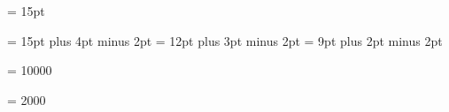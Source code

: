 \begin{\parsearg\beginxxx}
\let\documentencoding = \comment


%
\newdimen{} {} = 15pt

\chapheadingskip = 15pt plus 4pt minus 2pt
\secheadingskip = 12pt plus 3pt minus 2pt
\subsecheadingskip = 9pt plus 2pt minus 2pt

\vbadness = 10000

\hbadness = 2000


%
\def\setemergencystretch{%
  \ifx\emergencystretch\thisisundefined
    \def\emergencystretch{\dimen0}%
  \else
    \emergencystretch = .15\hsize
  \fi
}

%
\def\internalpagesizes#1#2#3#4#5#6{%
  \voffset = #3\relax
  \topskip = #6\relax
  \splittopskip = \topskip
  \vsize = #1\relax
  \advance\vsize by \topskip
  \outervsize = \vsize
  \advance\outervsize by 2\topandbottommargin
  \pageheight = \vsize
  \hsize = #2\relax
  \outerhsize = \hsize
  \advance\outerhsize by 0.5in
  \pagewidth = \hsize
  \normaloffset = #4\relax
  \bindingoffset = #5\relax
  \setleading{\textleading}
  \parindent = \defaultparindent
  \setemergencystretch
}

% 
\def\smallenvironments{%
  \let\smalldisplay = \smalldisplayx
  \let\smallexample = \smalllispx
  \let\smallformat = \smallformatx
  \let\smalllisp = \smalllispx
}

\def\letterpaper{{\globaldefs = 1
  \parskip = 3pt plus 2pt minus 1pt
  \textleading = 13.2pt
  \internalpagesizes{46\baselineskip}{6in}{\voffset}{.25in}{\bindingoffset}{36pt}%
}}


\end{\parsearg\beginxxx}
